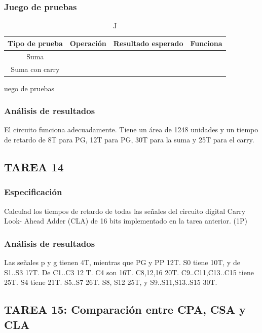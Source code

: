 \documentclass{article}
\begin{document}
		\subsubsection*{Juego de pruebas}
		\begin{table}[h]
			\begin{center}
				\begin{tabular}{| c | c | c | c |}
					\hline
					Tipo de prueba & Operación & Resultado esperado & Funciona \\ \hline
					
					Suma & & & \\ \hline
					Suma con carry & & & \\ \hline
				\end{tabular}
				\caption Juego de pruebas
			\end{center}
		\end{table}



		\subsubsection*{Análisis de resultados}
				El circuito funciona adecuadamente. Tiene un área de 1248 unidades y un tiempo de retardo de 8T para PG, 12T para PG, 30T para la suma y 25T para el carry.


	\subsection{TAREA 14}
		\subsubsection*{Especificación}
		Calculad los tiempos de retardo de todas las señales del circuito digital Carry Look-
		Ahead Adder (CLA) de 16 bits implementado en la tarea anterior. (1P)

		\subsubsection*{Análisis de resultados}
		Las señales p y g tienen 4T, mientras que PG y PP 12T. S0 tiene 10T, y de S1..S3 17T. De C1..C3 12 T. C4 son 16T. C8,12,16 20T. C9..C11,C13..C15 tiene 25T. S4 tiene 21T. S5..S7 26T. S8, S12 25T, y S9..S11,S13..S15 30T.

	\subsection{TAREA 15: Comparación entre CPA, CSA y CLA}
\end{document}
